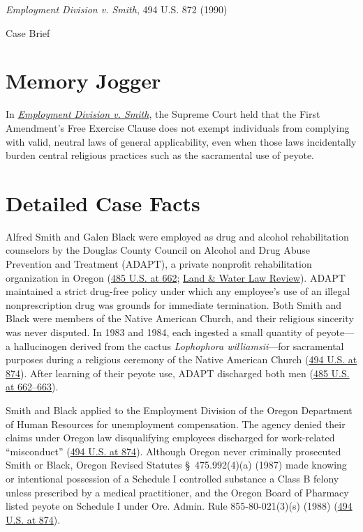 \documentclass[12pt]{article}
\begin{document}
\begin{center}
{\LARGE \textit{Employment Division v. Smith}, 494 U.S. 872 (1990)\par}
\vspace{0.8em}
{\large Case Brief\par}
\end{center}
\vspace{1em}

\section{Memory Jogger}

In \href{https://www.courtlistener.com/opinion/112404/employment-div-dept-of-human-resources-of-ore-v-smith/}{\textit{Employment Division v. Smith}}, the Supreme Court held that the First Amendment's Free Exercise Clause does not exempt individuals from complying with valid, neutral laws of general applicability, even when those laws incidentally burden central religious practices such as the sacramental use of peyote.

\section{Detailed Case Facts}

Alfred Smith and Galen Black were employed as drug and alcohol rehabilitation counselors by the Douglas County Council on Alcohol and Drug Abuse Prevention and Treatment (ADAPT), a private nonprofit rehabilitation organization in Oregon (\href{https://caselaw.findlaw.com/court/us-supreme-court/485/660.html}{485 U.S. at 662}; \href{https://scholarship.law.uwyo.edu/cgi/viewcontent.cgi?article=1898&context=land_water}{Land \& Water Law Review}). ADAPT maintained a strict drug-free policy under which any employee's use of an illegal nonprescription drug was grounds for immediate termination. Both Smith and Black were members of the Native American Church, and their religious sincerity was never disputed. In 1983 and 1984, each ingested a small quantity of peyote---a hallucinogen derived from the cactus \textit{Lophophora williamsii}---for sacramental purposes during a religious ceremony of the Native American Church (\href{https://supreme.justia.com/cases/federal/us/494/872/}{494 U.S. at 874}). After learning of their peyote use, ADAPT discharged both men (\href{https://tile.loc.gov/storage-services/service/ll/usrep/usrep485/usrep485660/usrep485660.pdf}{485 U.S. at 662--663}).

Smith and Black applied to the Employment Division of the Oregon Department of Human Resources for unemployment compensation. The agency denied their claims under Oregon law disqualifying employees discharged for work-related ``misconduct'' (\href{https://supreme.justia.com/cases/federal/us/494/872/}{494 U.S. at 874}). Although Oregon never criminally prosecuted Smith or Black, Oregon Revised Statutes \S~475.992(4)(a) (1987) made knowing or intentional possession of a Schedule I controlled substance a Class B felony unless prescribed by a medical practitioner, and the Oregon Board of Pharmacy listed peyote on Schedule I under Ore. Admin. Rule 855-80-021(3)(s) (1988) (\href{https://supreme.justia.com/cases/federal/us/494/872/}{494 U.S. at 874}).
\end{document}
